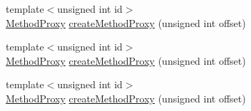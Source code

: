 \begin{DoxyCompactItemize}
\item 
{\footnotesize template$<$unsigned int id$>$ }\\\mbox{\hyperlink{structfakeit_1_1MethodProxy}{Method\+Proxy}} \mbox{\hyperlink{classfakeit_1_1MethodProxyCreator_abdfdb5f6152dbe98a2e72d2a30ea28dd}{create\+Method\+Proxy}} (unsigned int offset)
\item 
{\footnotesize template$<$unsigned int id$>$ }\\\mbox{\hyperlink{structfakeit_1_1MethodProxy}{Method\+Proxy}} \mbox{\hyperlink{classfakeit_1_1MethodProxyCreator_abdfdb5f6152dbe98a2e72d2a30ea28dd}{create\+Method\+Proxy}} (unsigned int offset)
\item 
{\footnotesize template$<$unsigned int id$>$ }\\\mbox{\hyperlink{structfakeit_1_1MethodProxy}{Method\+Proxy}} \mbox{\hyperlink{classfakeit_1_1MethodProxyCreator_abdfdb5f6152dbe98a2e72d2a30ea28dd}{create\+Method\+Proxy}} (unsigned int offset)
\end{DoxyCompactItemize}
